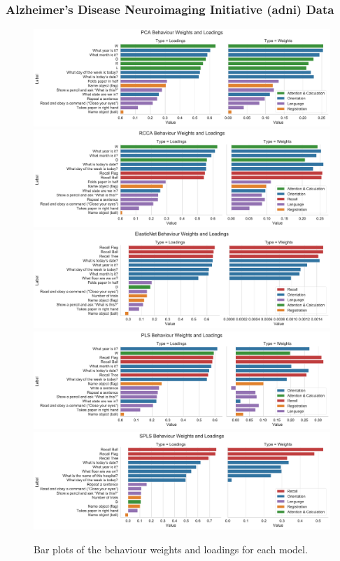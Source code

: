 \subsubsection{Alzheimer's Disease Neuroimaging Initiative (\acrshort{adni}) Data}

\begin{figure}
    \centering
    \includegraphics[width=0.8\linewidth]{figures/adni/PCA behaviour weights and loadings}
    \includegraphics[width=0.8\linewidth]{figures/adni/RCCA behaviour weights and loadings}
    \includegraphics[width=0.8\linewidth]{figures/adni/ElasticNet behaviour weights and loadings}
    \includegraphics[width=0.8\linewidth]{figures/adni/PLS behaviour weights and loadings}
    \includegraphics[width=0.8\linewidth]{figures/adni/SPLS behaviour weights and loadings}
    \caption{Bar plots of the behaviour \gls{weights} and \gls{loadings} for each model.}
\end{figure}

